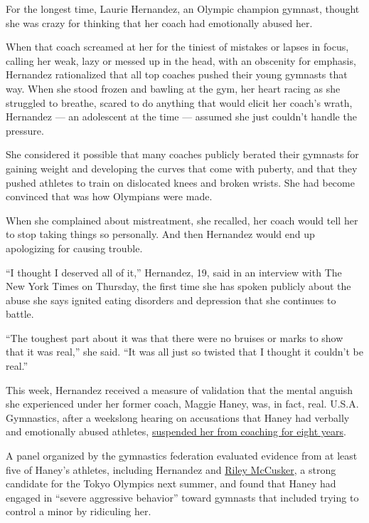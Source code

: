For the longest time, Laurie Hernandez, an Olympic champion gymnast,
thought she was crazy for thinking that her coach had emotionally abused
her.

When that coach screamed at her for the tiniest of mistakes or lapses in
focus, calling her weak, lazy or messed up in the head, with an
obscenity for emphasis, Hernandez rationalized that all top coaches
pushed their young gymnasts that way. When she stood frozen and bawling
at the gym, her heart racing as she struggled to breathe, scared to do
anything that would elicit her coach's wrath, Hernandez --- an
adolescent at the time --- assumed she just couldn't handle the
pressure.

She considered it possible that many coaches publicly berated their
gymnasts for gaining weight and developing the curves that come with
puberty, and that they pushed athletes to train on dislocated knees and
broken wrists. She had become convinced that was how Olympians were
made.

When she complained about mistreatment, she recalled, her coach would
tell her to stop taking things so personally. And then Hernandez would
end up apologizing for causing trouble.

``I thought I deserved all of it,'' Hernandez, 19, said in an interview
with The New York Times on Thursday, the first time she has spoken
publicly about the abuse she says ignited eating disorders and
depression that she continues to battle.

``The toughest part about it was that there were no bruises or marks to
show that it was real,'' she said. ``It was all just so twisted that I
thought it couldn't be real.''

This week, Hernandez received a measure of validation that the mental
anguish she experienced under her former coach, Maggie Haney, was, in
fact, real. U.S.A. Gymnastics, after a weekslong hearing on accusations
that Haney had verbally and emotionally abused athletes,
\href{https://www.nytimes.com/2020/04/29/sports/gymnastics-coach-banned-maggie-haney.html}{suspended
her from coaching for eight years}.

A panel organized by the gymnastics federation evaluated evidence from
at least five of Haney's athletes, including Hernandez and
\href{https://www.ocregister.com/2020/02/14/riley-mccusker-now-training-in-arizona-after-maggie-haney-suspension/}{Riley
McCusker}, a strong candidate for the Tokyo Olympics next summer, and
found that Haney had engaged in ``severe aggressive behavior'' toward
gymnasts that included trying to control a minor by ridiculing her.


